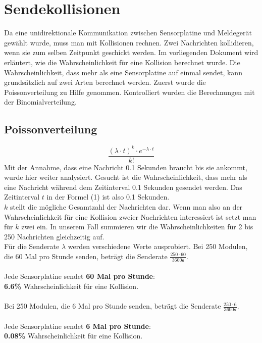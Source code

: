 \section{Sendekollisionen}
Da eine unidirektionale Kommunikation zwischen Sensorplatine und Meldegerät gewählt wurde, muss man mit Kollisionen rechnen. Zwei Nachrichten kollidieren, wenn sie zum selben Zeitpunkt geschickt werden. Im vorliegenden Dokument wird erläutert, wie die Wahrscheinlichkeit für eine Kollision berechnet wurde. Die Wahrscheinlichkeit, dass mehr als eine Sensorplatine auf einmal sendet, kann grundsätzlich auf zwei Arten berechnet werden. Zuerst wurde die Poissonverteilung zu Hilfe genommen. Kontrolliert wurden die Berechnungen mit der Binomialverteilung.\\
\subsection{Poissonverteilung}

\begin{equation}
\frac{\left(\lambda\cdot t\right)^k\cdot e^{-\lambda\cdot t}}{k!}
\end{equation}
Mit der Annahme, dass eine Nachricht 0.1 Sekunden braucht bis sie ankommt, wurde hier weiter analysiert. Gesucht ist die Wahrscheinlichkeit, dass mehr als eine Nachricht während dem Zeitinterval 0.1 Sekunden gesendet werden. Das Zeitinterval $t$ in der Formel (1) ist also 0.1 Sekunden.\\
$k$ stellt die mögliche Gesamtzahl der Nachrichten dar. Wenn man also an der Wahrscheinlichkeit für eine Kollision zweier Nachrichten interessiert ist setzt man für $k$ zwei ein. In unserem Fall summieren wir die Wahrscheinlichkeiten für 2 bis 250 Nachrichten gleichzeitig auf.\\
Für die Senderate $\lambda$ werden verschiedene Werte ausprobiert. Bei 250 Modulen, die 60 Mal pro Stunde senden, beträgt die Senderate $\frac{250 \cdot 60}{3600\textbf{s}}$. 
\\\\Jede Sensorplatine sendet \textbf{60 Mal pro Stunde}: \\ \textbf{6.6\%} Wahrscheinlichkeit für eine Kollision.\\\\
Bei 250 Modulen, die 6 Mal pro Stunde senden, beträgt die Senderate $\frac{250 \cdot 6}{3600\textbf{s}}$.
\\\\Jede Sensorplatine sendet \textbf{6 Mal pro Stunde}: \\ \textbf{0.08\%} Wahrscheinlichkeit für eine Kollision.\\
